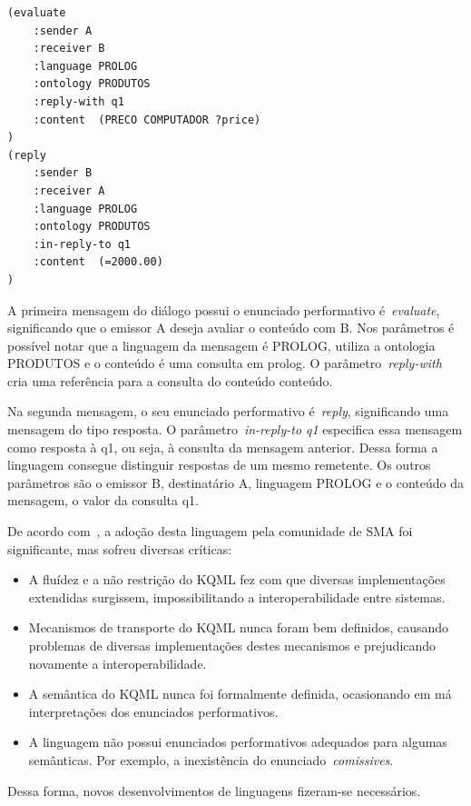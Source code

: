 \begin{lstlisting}[label=code:dialogo-kqml,caption=Exemplo de diálogo em KQML]
(evaluate
	:sender A
	:receiver B
	:language PROLOG
	:ontology PRODUTOS
	:reply-with q1
	:content  (PRECO COMPUTADOR ?price)
)
(reply
	:sender B
	:receiver A
	:language PROLOG
	:ontology PRODUTOS
	:in-reply-to q1
	:content  (=2000.00)
)
\end{lstlisting}

A primeira mensagem do diálogo possui o enunciado performativo é~\emph{evaluate}, significando que o emissor A deseja avaliar o conteúdo com B. Nos parâmetros é possível notar que a linguagem da mensagem é PROLOG, utiliza a ontologia PRODUTOS e o conteúdo é uma consulta em prolog. O parâmetro~\emph{reply-with} cria uma referência para a consulta do conteúdo conteúdo.

Na segunda mensagem, o seu enunciado performativo é~\emph{reply}, significando uma mensagem do tipo resposta. O parâmetro~\emph{in-reply-to q1} especifica essa mensagem como resposta à q1, ou seja, à consulta da mensagem anterior. Dessa forma a linguagem consegue distinguir respostas de um mesmo remetente. Os outros parâmetros são o emissor B, destinatário A, linguagem PROLOG e o conteúdo da mensagem, o valor da consulta q1.

De acordo com~\cite{wooldridge04}, a adoção desta linguagem pela comunidade de SMA foi significante, mas sofreu diversas críticas:
\begin{itemize}
	\item A fluídez e a não restrição do KQML fez com que diversas implementações extendidas surgissem, impossibilitando a interoperabilidade entre sistemas.
	\item Mecanismos de transporte do KQML nunca foram bem definidos, causando problemas de diversas implementações destes mecanismos e prejudicando novamente a interoperabilidade.
	\item A semântica do KQML nunca foi formalmente definida, ocasionando em má interpretações dos enunciados performativos.
	\item A linguagem não possui enunciados performativos adequados para algumas semânticas. Por exemplo, a inexistência do enunciado~\emph{comissives}.
\end{itemize}

Dessa forma, novos desenvolvimentos de linguagens fizeram-se necessários.

